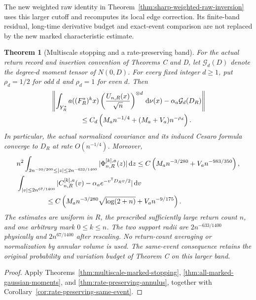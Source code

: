 \documentclass[11pt,reqno]{amsart}
\numberwithin{equation}{section}
\newtheorem{maintheorem}{Theorem}
\theoremstyle{definition}\newtheorem{definition}[theorem]{Definition}
\theoremstyle{remark}\newtheorem{remark}[theorem]{Remark}
\newcommand{\dd}{\,\mathrm d}\newcommand{\one}{\mathbf1}
\begin{document}
The new weighted raw identity in
Theorem~\ref{thm:sharp-weighted-raw-inversion} uses this larger cutoff
and recomputes its local edge correction. Its finite-band residual,
long-time derivative budget and exact-event comparison are not replaced
by the new marked characteristic estimate.


\begin{maintheorem}[Multiscale stopping and a rate-preserving band]
\label{thm:intro-multiscale-stopping}
For the actual return record and insertion convention of Theorems C and D,
let $\mathcal G_d(D)$ denote the degree-$d$ moment tensor of $N(0,D)$.
For every fixed integer $d\ge1$, put $\rho_d=1/2$ for odd $d$ and
$\rho_d=1$ for even $d$. Then
\begin{align*}
 &\left\|\int_{Y_R^*}a((F_R^*)^kx)
       \left(\frac{U_{n,R}(x)}{\sqrt n}\right)^{\otimes d}\dd\nu(x)
                      -\alpha_a\mathcal G_d(D_R)\right\|\\
 &\hspace{15mm}\le C_d\left(M_an^{-1/4}+(M_a+V_a)n^{-\rho_d}\right).
\end{align*}
In particular, the actual normalized covariance and its induced Cesaro
formula converge to $D_R$ at rate $O(n^{-1/4})$. Moreover,
\begin{align*}
 &n^2\int_{2n^{-99/200}\le|z|\le2n^{-633/1400}}
                    |\Phi^{[k],a}_{n,R}(z)|\dd z
      \le C\left(M_an^{-3/280}+V_an^{-983/350}\right),\\
 &\int_{|v|\le2n^{67/1400}}
       |C^{[k],a}_{n,R}(v)-\alpha_a e^{-v^{\mathsf T}D_Rv/2}|\dd v\\
 &\hspace{15mm}\le C\left(M_an^{-3/280}\sqrt{\log(2+n)}
                                   +V_an^{-9/175}\right).
\end{align*}
The estimates are uniform in $R$, the prescribed sufficiently large
return count $n$, and one arbitrary mark $0\le k\le n$. The two support
radii are $2n^{-633/1400}$ physically and $2n^{67/1400}$ after rescaling.
No return-count averaging or normalization by annular volume is used.
The same-event consequence retains the original probability and variation
budget of Theorem C on this larger band.
\end{maintheorem}
\begin{proof}
Apply Theorems~\ref{thm:multiscale-marked-stopping},
\ref{thm:all-marked-gaussian-moments}, and
\ref{thm:rate-preserving-annulus}, together with
Corollary~\ref{cor:rate-preserving-same-event}.
\end{proof}
\end{document}
